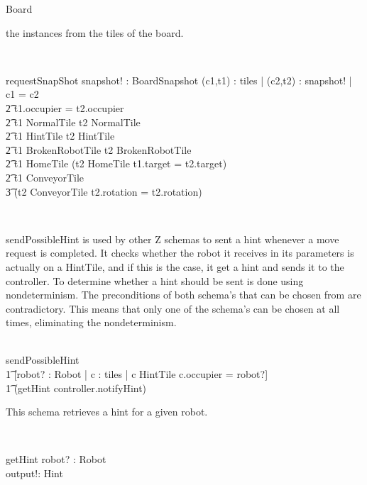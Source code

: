 \documentclass[12pt]{article}
\begin{document}
\begin{class}{Board}
\begin{zpar}
the instances from the tiles of the board.
\end{zpar} \\
\begin{schema}{requestSnapShot}
snapshot! : BoardSnapshot
\where
\forall (c1,t1) : tiles | \exists (c2,t2) : snapshot! | c1 = c2 \: \wedge \\ \t2
t1.occupier = t2.occupier \: \wedge \\ \t2
t1 \in NormalTile \Rightarrow t2 \in NormalTile \: \wedge \\ \t2
t1 \in HintTile \Rightarrow t2 \in HintTile \: \wedge \\ \t2
t1 \in BrokenRobotTile \Rightarrow t2 \in BrokenRobotTile \: \wedge \\ \t2
t1 \in HomeTile \Rightarrow (t2 \in HomeTile \wedge t1.target = t2.target) \: \wedge \\ \t2
t1 \in ConveyorTile \Rightarrow \\ \t3 (t2 \in ConveyorTile \wedge t2.rotation = t2.rotation)
\end{schema} \\
\znewpage
\begin{zpar}
sendPossibleHint is used by other Z schemas to sent a hint whenever
a move request is completed. It checks whether the robot it receives in its
parameters is actually on a HintTile, and if this is the case, it get a hint
and sends it to the controller.
To determine whether a hint should be sent is done using nondeterminism.
The preconditions of both schema's that can be chosen from are contradictory.
This means that only one of the schema's can be chosen at all times,
eliminating the nondeterminism.
\end{zpar} \\
sendPossibleHint \sdef [robot? : Robot | \\ \t2 \neg \exists c : \ran tiles | c \in HintTile \wedge c.occupier = robot?] \; \; [] \\ \t1
[robot? : Robot | \exists c : \ran tiles | c \in HintTile \wedge c.occupier = robot?] \; \; \wedge \\ \t1 (getHint \comp controller.notifyHint) \\
\begin{zpar}
This schema retrieves a hint for a given robot.
\end{zpar} \\
\begin{schema}{getHint}
robot? : Robot \\
output!: Hint \\

\end{schema}
\end{class}
\end{document}
